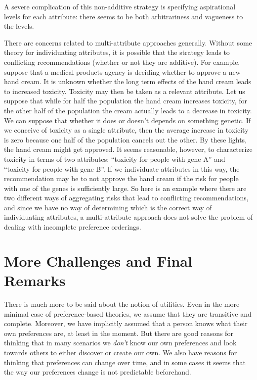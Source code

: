 \documentclass[]{tufte-book}
\begin{document}
A severe complication of this non-additive strategy is specifying aspirational levels for each attribute: there seems to be both arbitrariness and vagueness to the levels.

There are concerns related to multi-attribute approaches generally. Without some theory for individuating attributes, it is possible that the strategy leads to conflicting recommendations (whether or not they are additive). For example, suppose that a medical products agency is deciding whether to approve a new hand cream. It is unknown whether the long term effects of the hand cream leads to increased toxicity. Toxicity may then be taken as a relevant attribute. Let us suppose that while for half the population the hand cream increases toxicity, for the other half of the population the cream actually leads to a decrease in toxicity. We can suppose that whether it does or doesn't depends on something genetic. If we conceive of toxicity as a single attribute, then the average increase in toxicity is zero because one half of the population cancels out the other. By these lights, the hand cream might get approved. It seems reasonable, however, to characterize toxicity in terms of two attributes: ``toxicity for people with gene A'' and ``toxicity for people with gene B''. If we individuate attributes in this way, the recommendation may be to not approve the hand cream if the risk for people with one of the genes is sufficiently large. So here is an example where there are two different ways of aggregating risks that lead to conflicting recommendations, and since we have no way of determining which is the correct way of individuating attributes, a multi-attribute approach does not solve the problem of dealing with incomplete preference orderings.

\hypertarget{more-challenges-and-final-remarks}{%
\section{More Challenges and Final Remarks}\label{more-challenges-and-final-remarks}}

There is much more to be said about the notion of utilities. Even in the more minimal case of preference-based theories, we assume that they are transitive and complete. Moreover, we have implicitly assumed that a person knows what their own preferences are, at least in the moment. But there are good reasons for thinking that in many scenarios we \emph{don't} know our own preferences and look towards others to either discover or create our own. We also have reasons for thinking that preferences can change over time, and in some cases it seems that the way our preferences change is not predictable beforehand.
\end{document}

